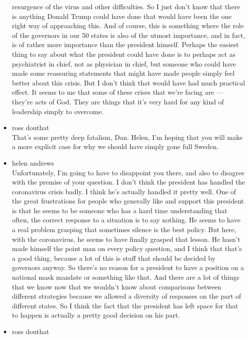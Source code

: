 \begin{itemize}
  resurgence of the virus and other difficulties. So I just don't know
  that there is anything Donald Trump could have done that would have
  been the one right way of approaching this. And of course, this is
  something where the role of the governors in our 50 states is also of
  the utmost importance, and in fact, is of rather more importance than
  the president himself. Perhaps the easiest thing to say about what the
  president could have done is to perhaps act as psychiatrist in chief,
  not as physician in chief, but someone who could have made some
  reassuring statements that might have made people simply feel better
  about this crisis. But I don't think that would have had much
  practical effect. It seems to me that some of these crises that we're
  facing are --- they're acts of God. They are things that it's very
  hard for any kind of leadership simply to overcome.
\item
  ross douthat\\
  That's some pretty deep fatalism, Dan. Helen, I'm hoping that you will
  make a more explicit case for why we should have simply gone full
  Sweden.
\item
  helen andrews\\
  Unfortunately, I'm going to have to disappoint you there, and also to
  disagree with the premise of your question. I don't think the
  president has handled the coronavirus crisis badly. I think he's
  actually handled it pretty well. One of the great frustrations for
  people who generally like and support this president is that he seems
  to be someone who has a hard time understanding that often, the
  correct response to a situation is to say nothing. He seems to have a
  real problem grasping that sometimes silence is the best policy. But
  here, with the coronavirus, he seems to have finally grasped that
  lesson. He hasn't made himself the point man on every policy question,
  and I think that that's a good thing, because a lot of this is stuff
  that should be decided by governors anyway. So there's no reason for a
  president to have a position on a national mask mandate or something
  like that. And there are a lot of things that we know now that we
  wouldn't know about comparisons between different strategies because
  we allowed a diversity of responses on the part of different states.
  So I think the fact that the president has left space for that to
  happen is actually a pretty good decision on his part.
\item
  ross douthat\\

\end{itemize}
